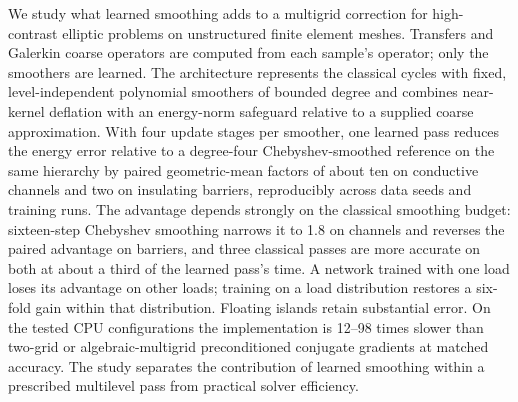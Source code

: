 We study what learned smoothing adds to a multigrid correction for high-contrast elliptic problems on unstructured finite
element meshes. Transfers and Galerkin coarse operators are computed from each sample's operator; only the smoothers are
learned. The architecture represents the classical cycles with fixed, level-independent polynomial smoothers of bounded
degree and combines near-kernel deflation with an energy-norm safeguard relative to a supplied coarse approximation. With four update stages per smoother, one learned pass reduces the energy error relative
to a degree-four Chebyshev-smoothed reference on the same hierarchy by paired geometric-mean factors of about ten on
conductive channels and two on insulating barriers, reproducibly across data seeds and training runs.
The advantage depends strongly on the classical smoothing budget: sixteen-step Chebyshev smoothing narrows it to 1.8 on
channels and reverses the paired advantage on barriers, and three classical passes are more accurate on both at about a
third of the learned pass's time. A network trained with one load loses its advantage on other loads; training on a load
distribution restores a six-fold gain within that distribution. Floating islands retain substantial error. On the tested
CPU configurations the implementation is 12--98 times slower than two-grid or algebraic-multigrid preconditioned conjugate
gradients at matched accuracy. The study separates the contribution of learned smoothing within a prescribed multilevel pass
from practical solver efficiency.
